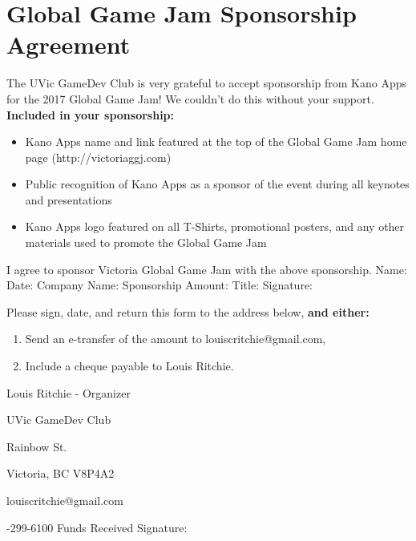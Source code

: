 \documentclass{article}
\newcommand{\companyName}{Kano Apps}
\begin{document}
\section{Global Game Jam Sponsorship Agreement}

The UVic GameDev Club is very grateful to accept sponsorship from \companyName{} for the 2017 Global Game Jam! We couldn't do this without your support.
\newline
\newline
\noindent
\textbf{Included in your sponsorship:}
\begin{itemize}
  \item{\companyName{} name and link featured at the top of the Global Game Jam home page (http://victoriaggj.com)}
  \item{Public recognition of \companyName{} as a sponsor of the event during all keynotes and presentations}
  \item{\companyName{} logo featured on all T-Shirts, promotional posters, and any other materials used to promote the Global Game Jam}
\end{itemize}

\bigskip
\bigskip
\bigskip
\bigskip

\noindent
I agree to sponsor Victoria Global Game Jam with the above sponsorship.
\newline
\newline
\noindent
Name: \underline{\hspace{8cm}}
\newline
\newline
\noindent
Date: \underline{\hspace{8cm}}
\newline
\newline
\noindent
Company Name: \underline{\hspace{8cm}}
\newline
\newline
\noindent
Sponsorship Amount: \underline{\hspace{8cm}}
\newline
\newline
\noindent
Title: \underline{\hspace{8cm}}
\newline
\newline
\noindent
Signature: \underline{\hspace{8cm}}
\newline
\newline

\bigskip
\bigskip
\noindent
Please sign, date, and return this form to the address below, \textbf{and either:}
\begin{enumerate}
  \item{Send an e-transfer of the amount to louiscritchie@gmail.com,}
  \item{Include a cheque payable to Louis Ritchie.}
\end{enumerate}

\noindent
Louis Ritchie - Organizer

\noindent
UVic GameDev Club

 Rainbow St.

\noindent
Victoria, BC V8P4A2

\noindent
louiscritchie@gmail.com

-299-6100
\newline
\newline
\noindent
Funds Received Signature: \underline{\hspace{8cm}}
\end{document}
